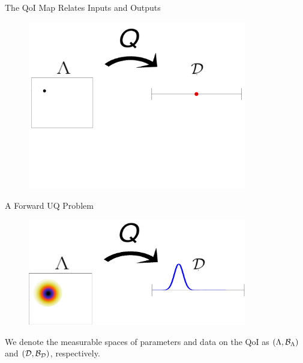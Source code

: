 \begin{frame}{The QoI Map Relates Inputs and Outputs}
{\begin{figure}[h]
	\includegraphics[width=0.85\textwidth]{./figures/threelevels/schematic_lambda_data_level1.pdf}
\end{figure}

}

\end{frame}

\begin{frame}{A Forward UQ Problem}

\begin{figure}[h]
	\includegraphics[width=0.85\textwidth]{./figures/threelevels/schematic_lambda_data_level3.pdf}
\end{figure}

{We denote the measurable spaces of parameters and data on the QoI as $({\Lambda},\mathcal{B}_{{\Lambda}})$ and $(\mathcal{D},\mathcal{B}_{\mathcal{D}})$, respectively.}
\bigskip


\end{frame}

